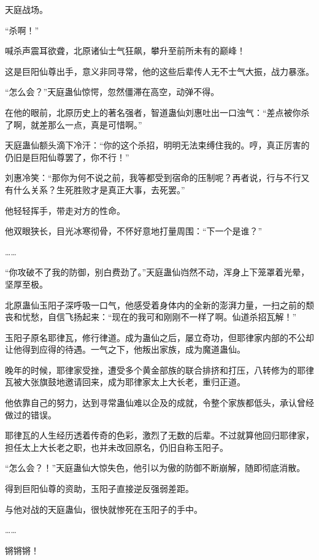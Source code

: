 
\begin{this_body}

天庭战场。

“杀啊！”

喊杀声震耳欲聋，北原诸仙士气狂飙，攀升至前所未有的巅峰！

这是巨阳仙尊出手，意义非同寻常，他的这些后辈传人无不士气大振，战力暴涨。

“怎么会？”天庭蛊仙惊愕，忽然僵滞在高空，动弹不得。

在他的眼前，北原历史上的著名强者，智道蛊仙刘惠吐出一口浊气：“差点被你杀了啊，就差那么一点，真是可惜啊。”

天庭蛊仙额头滴下冷汗：“你的这个杀招，明明无法束缚住我的。哼，真正厉害的仍旧是巨阳仙尊罢了，你不行！”

刘惠冷笑：“那你为何不说之前，我等都受到宿命的压制呢？再者说，行与不行又有什么关系？生死胜败才是真正大事，去死罢。”

他轻轻挥手，带走对方的性命。

他双眼狭长，目光冰寒彻骨，不怀好意地打量周围：“下一个是谁？”

……

“你攻破不了我的防御，别白费劲了。”天庭蛊仙岿然不动，浑身上下笼罩着光晕，坚厚至极。

北原蛊仙玉阳子深呼吸一口气，他感受着身体内的全新的澎湃力量，一扫之前的颓丧和忧愁，自信飞扬起来：“现在的我可和刚刚不一样了啊。仙道杀招瓦解！”

玉阳子原名耶律瓦，修行律道。成为蛊仙之后，屡立奇功，但耶律家内部的不公却让他得到应得的待遇。一气之下，他叛出家族，成为魔道蛊仙。

晚年的时候，耶律家受挫，遭受多个黄金部族的联合排挤和打压，八转修为的耶律瓦被大张旗鼓地邀请回来，成为耶律家太上大长老，重归正道。

他依靠自己的努力，达到寻常蛊仙难以企及的成就，令整个家族都低头，承认曾经做过的错误。

耶律瓦的人生经历透着传奇的色彩，激烈了无数的后辈。不过就算他回归耶律家，担任太上大长老之职，也并未改回原名，仍旧自称玉阳子。

“怎么会？！”天庭蛊仙大惊失色，他引以为傲的防御不断崩解，随即彻底消散。

得到巨阳仙尊的资助，玉阳子直接逆反强弱差距。

与他对战的天庭蛊仙，很快就惨死在玉阳子的手中。

……

锵锵锵！


\end{this_body}
